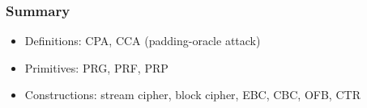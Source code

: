 \begin{frame}\frametitle{Summary}
\begin{itemize}
\item Definitions: CPA, CCA (padding-oracle attack)
\item Primitives: PRG, PRF, PRP
\item Constructions: stream cipher, block cipher, EBC, CBC, OFB, CTR
\end{itemize}
\end{frame}


